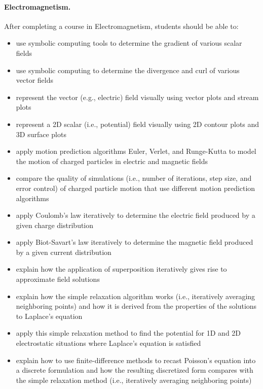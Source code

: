 \documentclass[graybox,envcountchap,sectrefs]{svmult}
\begin{document}
\paragraph{Electromagnetism.}
After completing a course in Electromagnetism, students should be able to:
\begin{itemize}
\item use symbolic computing tools to determine the gradient of various scalar fields

\item use symbolic computing to determine the divergence and curl of various vector fields

\item represent the vector (e.g., electric) field visually using vector plots and stream plots

\item represent a 2D scalar (i.e., potential) field visually using 2D contour plots and 3D surface plots

\item apply motion prediction algorithms Euler, Verlet, and Runge-Kutta to model the motion of charged particles in electric and magnetic fields

\item compare the quality of simulations (i.e., number of iterations, step size, and error control) of charged particle motion that use different motion prediction algorithms

\item apply Coulomb's law iteratively to determine the electric field produced by a given charge distribution

\item apply Biot-Savart's law iteratively to determine the magnetic field produced by a given current distribution

\item explain how the application of superposition iteratively gives rise to approximate field solutions

\item explain how the simple relaxation algorithm works (i.e., iteratively averaging neighboring points) and how it is derived from the properties of the solutions to Laplace's equation

\item apply this simple relaxation method to find the potential for 1D and 2D electrostatic situations where Laplace's equation is satisfied

\item explain how to use  finite-difference methods to recast Poisson's equation into a discrete formulation and how the resulting discretized form compares with the simple relaxation method (i.e., iteratively averaging neighboring points)


\end{itemize}
\end{document}
